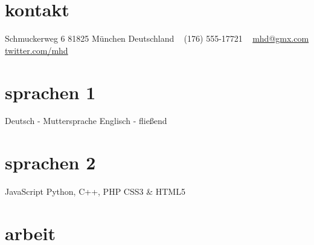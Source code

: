 \documentclass[]{friggeri-cv-a4}
\begin{document}


\begin{aside} %
\section{kontakt}
Schmuckerweg 6
81825 München
Deutschland
~
(176) 555-17721
~
\href{mailto:mhd@gmx.com}{mhd@gmx.com}
\href{http://twitter.com/mhd}{twitter.com/mhd}
\section{sprachen 1}
Deutsch - Muttersprache
Englisch - fließend
\section{sprachen 2}
JavaScript
Python, C++, PHP
CSS3 \& HTML5
\end{aside}


\section{arbeit}

\end{document}
